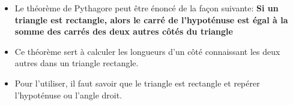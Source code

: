   
\begin{itemize}
\item Le théorème de Pythagore peut être énoncé de la façon suivante: \og \textbf{Si un triangle est rectangle, alors le carré de l'hypoténuse est égal à la somme des carrés des deux autres côtés du triangle} \fg{} 
\item Ce théorème sert à calculer les longueurs d'un côté connaissant les deux autres dans un triangle rectangle.
\item Pour l'utiliser, il faut savoir que le triangle est rectangle et repérer l'hypoténuse ou l'angle droit.
\end{itemize}
